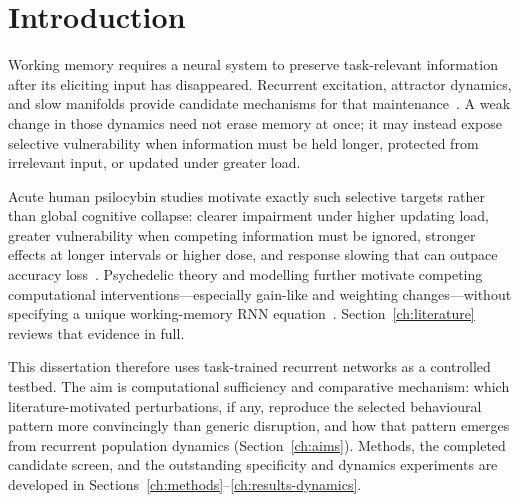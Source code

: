 \section{Introduction}
\label{ch:introduction}

Working memory requires a neural system to preserve task-relevant information
after its eliciting input has disappeared. Recurrent excitation, attractor
dynamics, and slow manifolds provide candidate mechanisms for that
maintenance~\cite{wang2013nmda,ghazizadeh2021}. A weak change in those dynamics
need not erase memory at once; it may instead expose selective vulnerability
when information must be held longer, protected from irrelevant input, or
updated under greater load.

Acute human psilocybin studies motivate exactly such selective targets rather
than global cognitive collapse: clearer impairment under higher updating load,
greater vulnerability when competing information must be ignored, stronger
effects at longer intervals or higher dose, and response slowing that can
outpace accuracy loss~\cite{barrett2018,carter2005,wittmann2007,vollenweider1998,yousefi2025}.
Psychedelic theory and modelling further motivate competing computational
interventions---especially gain-like and weighting changes---without specifying
a unique working-memory RNN equation~\cite{carhartharris2019,herzog2023}.
Section~\ref{ch:literature} reviews that evidence in full.

This dissertation therefore uses task-trained recurrent networks as a
controlled testbed. The aim is computational sufficiency and comparative
mechanism: which literature-motivated perturbations, if any, reproduce the
selected behavioural pattern more convincingly than generic disruption, and
how that pattern emerges from recurrent population dynamics
(Section~\ref{ch:aims}). Methods, the completed candidate screen, and the
outstanding specificity and dynamics experiments are developed in
Sections~\ref{ch:methods}--\ref{ch:results-dynamics}.
